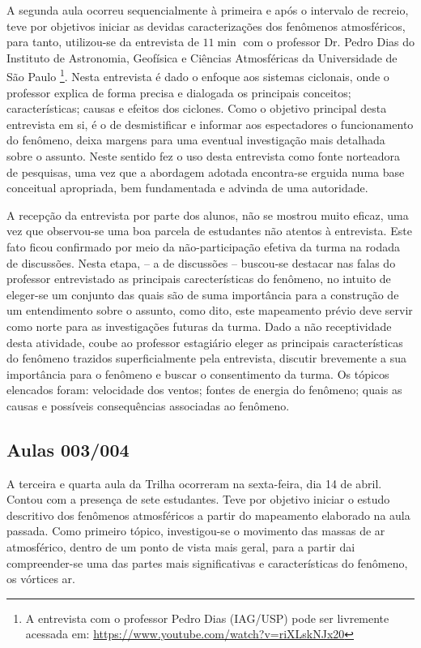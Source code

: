 A segunda aula ocorreu sequencialmente à primeira e após o intervalo de recreio, teve por objetivos iniciar as devidas caracterizações dos fenômenos atmosféricos, para tanto, utilizou-se da entrevista de $11\min$ com o professor Dr. Pedro Dias do Instituto de Astronomia, Geofísica e Ciências Atmosféricas da Universidade de São Paulo \footnote{A entrevista com o professor Pedro Dias (IAG/USP) pode ser livremente acessada em: \url{https://www.youtube.com/watch?v=riXLskNJx20}}. Nesta entrevista é dado o enfoque aos sistemas ciclonais, onde o professor explica de forma precisa e dialogada os principais conceitos; características; causas e efeitos dos ciclones. Como o objetivo principal desta entrevista em si, é o de desmistificar e informar aos espectadores o funcionamento do fenômeno, deixa margens para uma eventual investigação mais detalhada sobre o assunto. Neste sentido fez o uso desta entrevista como fonte norteadora de pesquisas, uma vez que a abordagem adotada encontra-se erguida numa base conceitual apropriada, bem fundamentada e advinda de uma autoridade.

A recepção da entrevista por parte dos alunos, não se mostrou muito eficaz, uma vez que observou-se uma boa parcela de estudantes não atentos à entrevista. Este fato ficou confirmado por meio da não-participação efetiva da turma na rodada de discussões. Nesta etapa, -- a de discussões --  buscou-se destacar nas falas do professor entrevistado as principais carecterísticas do fenômeno, no intuito de eleger-se um conjunto das quais são de suma importância para a construção de um entendimento sobre o assunto, como dito, este mapeamento prévio deve servir como norte para as investigações futuras da turma. Dado a não receptividade desta atividade, coube ao professor estagiário eleger as principais características do fenômeno trazidos superficialmente pela entrevista, discutir brevemente a sua importância para o fenômeno e buscar o consentimento da turma. Os tópicos elencados foram: velocidade dos ventos; fontes de energia do fenômeno; quais as causas e possíveis consequências associadas ao fenômeno. 

\subsection{Aulas 003/004} %
\label{sub:Aulas 003/004}
A terceira e quarta aula da Trilha ocorreram na sexta-feira, dia 14 de abril. Contou com a presença de sete estudantes. Teve por objetivo iniciar o estudo descritivo dos fenômenos atmosféricos a partir do mapeamento elaborado na aula passada. Como primeiro tópico, investigou-se o movimento das massas de ar atmosférico, dentro de um ponto de vista mais geral, para a partir dai compreender-se uma das partes mais significativas e características do fenômeno, os vórtices ar.

